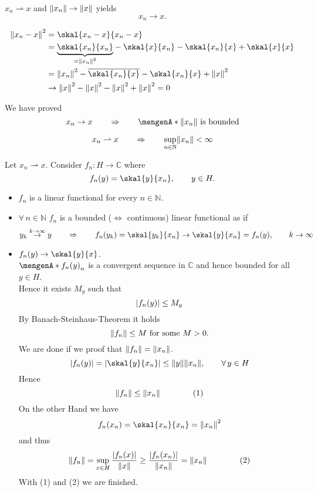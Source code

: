 \begin{satz}
	$x_n \rightharpoonup x$ and $\norm{x_n} \to \norm{x}$ yields
	\[
		x_n \to x.
	\]
\end{satz}
\begin{beweis}
	\begin{align*}
		\norm{x_n-x}^2 &= \skal{x_n -x}{x_n-x} \\
		&= \underset{= \norm{x_n}^2}{\underbrace{\skal{x_n}{x_n}}} - \skal{x}{x_n}- \skal{x_n}{x} + \skal{x}{x} \\
		&= \norm{x_n}^2 - \overline{\skal{x_n}{x}} - \skal{x_n}{x} + \norm{x}^2 \\
		&\to \norm{x}^2 - \norm{x}^2 - \norm{x}^2 + \norm{x}^2 = 0
	\end{align*}
\end{beweis}

We have proved 
\[
	x_n \to x \qquad \Rightarrow \qquad \set{\norm{x_n}} \text{ is bounded}
\]

\begin{theorem}
	\[
		x_n \rightharpoonup x \qquad \Rightarrow \qquad \sup_{n \in \mathbb{N}}\norm{x_n} < \infty
	\]
\end{theorem}
\begin{beweis}
	Let $x_n \rightharpoonup x$. Consider $f_n: H \to \mathbb{C}$ where
	\[
		f_n(y) = \skal{y}{x_n}, \qquad y \in H.
	\]
	\begin{itemize}
		\item $f_n$ is a linear functional for every $n \in \mathbb{N}$.
		\item $\forall\, n \in \mathbb{N}$ $f_n$ is a bounded ($\Leftrightarrow$ continuous) linear functional as if 
		\[
			y_k \stackrel{k \to \infty}{\to }y \qquad \Rightarrow \qquad f_n(y_k) = \skal{y_k}{x_n} \to \skal{y}{x_n} = f_n(y), \qquad k \to \infty
		\]
		\item $f_n(y) \to \skal{y}{x}$. \\
		$\set{f_n(y)}_n$ is a convergent sequence in $\mathbb{C}$ and hence bounded for all $y \in H$. \\
		Hence it exists $M_y$ such that 
		\[
			\lvert f_n(y)\rvert \leq M_y
		\]
		By Banach-Steinhaus-Theorem it holds
		\[
			\norm{f_n} \leq M \text{ for some }M >0.
		\]
		We are done if we proof that $\norm{f_n} = \norm{x_n}$.
		\[
			\abs{f_n(y)}= \abs{\skal{y}{x_n}} \leq \norm{y} \norm{x_n}, \qquad \forall\, y \in H
		\]
		Hence 
		\[
			\norm{f_n} \leq \norm{x_n} \qquad \qquad (1)
		\]
		On the other Hand we have
		\[
			f_n(x_n) = \skal{x_n}{x_n}= \norm{x_n}^2
		\]
		and thus
		\[
			\norm{f_n} = \sup_{x \in H} \frac{\abs{f_n(x)}}{\norm{x}} \geq \frac{\abs{f_n(x_n)}}{\norm{x_n}} = \norm{x_n} \qquad \qquad (2)
		\]
		With (1) and (2) we are finished.
	\end{itemize}
\end{beweis}

